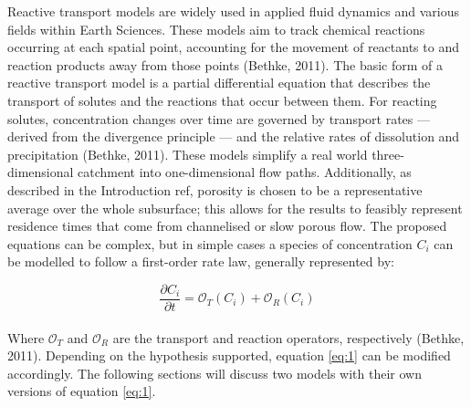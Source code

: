Reactive transport models are widely used in applied fluid dynamics and various fields within Earth Sciences. These models aim to track chemical reactions occurring at each spatial point, accounting for the movement of reactants to and reaction products away from those points (Bethke, 2011). The basic form of a reactive transport model is a partial differential equation that describes the transport of solutes and the reactions that occur between them. For reacting solutes, concentration changes over time are governed by transport rates — derived from the divergence principle — and the relative rates of dissolution and precipitation (Bethke, 2011). These models simplify a real world three-dimensional catchment into one-dimensional flow paths. Additionally, as described in the Introduction ref, porosity is chosen to be a representative average over the whole subsurface; this allows for the results to feasibly represent residence times that come from channelised or slow porous flow. The proposed equations can be complex, but in simple cases a species of concentration $C_i$ can be modelled to follow a first-order rate law, generally represented by:

\begin{equation}
    \frac{\partial C_i}{\partial t} = \mathcal{O}_{T}(C_i) + \mathcal{O}_{R}(C_i)
    \label{eq:1}
\end{equation}\\


Where \(\mathcal{O}_{T}\) and \(\mathcal{O}_{R}\) are the transport and reaction operators, respectively (Bethke, 2011). Depending on the hypothesis supported, equation \ref{eq:1} can be modified accordingly. The following sections will discuss two models with their own versions of equation \ref{eq:1}.

